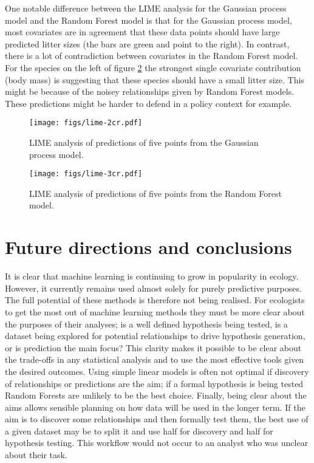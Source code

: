 \documentclass[10pt,]{article}
\begin{document}
One notable difference between the LIME analysis for the Gaussian process model and the Random Forest model is that for the Gaussian process model, most covariates are in agreement that these data points should have large predicted litter sizes (the bars are green and point to the right).
In contrast, there is a lot of contradiction between covariates in the Random Forest model.
For the species on the left of figure \ref{fig:limerf} the strongest single covariate contribution (body mass) is suggesting that these species should have a small litter size.
This might be because of the noisey relationships given by Random Forest models.
These predictions might be harder to defend in a policy context for example.


\begin{figure}[t!]
\centering
\texttt{[image: figs/lime-2cr.pdf]}
\caption{LIME analysis of predictions of five points from the Gaussian process model.\protect\label{fig:limegp}}
\end{figure}

\begin{figure}[t!]
\centering
\texttt{[image: figs/lime-3cr.pdf]}
\caption{LIME analysis of predictions of five points from the Random Forest model.\protect\label{fig:limerf}}
\end{figure}

\section{Future directions and conclusions}\label{future-directions-and-conclusions}

It is clear that machine learning is continuing to grow in popularity in ecology.
However, it currently remains used almost solely for purely predictive purposes.
The full potential of these methods is therefore not being realised.
For ecologists to get the most out of machine learning methods they must be more clear about the purposes of their analyses; is a well defined hypothesis being tested, is a dataset being explored for potential relationships to drive hypothesis generation, or is prediction the main focus?
This clarity makes it possible to be clear about the trade-offs in any statistical analysis and to use the most effective tools given the desired outcomes.
Using simple linear models is often not optimal if discovery of relationships or predictions are the aim; if a formal hypothesis is being tested Random Forests are unlikely to be the best choice.
Finally, being clear about the aims allows sensible planning on how data will be used in the longer term.
If the aim is to discover some relationships and then formally test them, the best use of a given dataset may be to split it and use half for discovery and half for hypothesis testing.
This workflow would not occur to an analyst who was unclear about their task.
\end{document}
